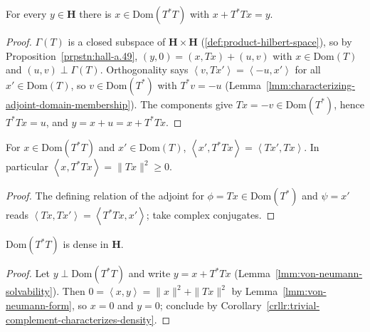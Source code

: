 \begin{lemma}[Solvability of $x + T^*Tx = y$]
    \label{lmm:von-neumann-solvability}
    \leanok
    For every $y \in \mathbf{H}$ there is $x \in \text{Dom}(T^*T)$ with $x + T^*Tx = y$.
\end{lemma}
\begin{proof}
    \leanok
    $\Gamma(T)$ is a closed subspace of $\mathbf{H} \times \mathbf{H}$ (\ref{def:product-hilbert-space}), so by Proposition~\ref{prpstn:hall-a.49}, $(y, 0) = (x, Tx) + (u, v)$ with $x \in \text{Dom}(T)$ and $(u, v) \perp \Gamma(T)$. Orthogonality says $\left< v, Tx' \right> = \left< -u, x' \right>$ for all $x' \in \text{Dom}(T)$, so $v \in \text{Dom}(T^*)$ with $T^*v = -u$ (Lemma~\ref{lmm:characterizing-adjoint-domain-membership}). The components give $Tx = -v \in \text{Dom}(T^*)$, hence $T^*Tx = u$, and $y = x + u = x + T^*Tx$.
\end{proof}

\begin{lemma}
    \label{lmm:von-neumann-form}
    \leanok
    For $x \in \text{Dom}(T^*T)$ and $x' \in \text{Dom}(T)$, $\left< x', T^*Tx \right> = \left< Tx', Tx \right>$. In particular $\left< x, T^*Tx \right> = \|Tx\|^2 \ge 0$.
\end{lemma}
\begin{proof}
    \leanok
    The defining relation of the adjoint for $\phi = Tx \in \text{Dom}(T^*)$ and $\psi = x'$ reads $\left< Tx, Tx' \right> = \left< T^*Tx, x' \right>$; take complex conjugates.
\end{proof}

\begin{lemma}
    \label{lmm:von-neumann-dense-domain}
    \leanok
    $\text{Dom}(T^*T)$ is dense in $\mathbf{H}$.
\end{lemma}
\begin{proof}
    \leanok
    Let $y \perp \text{Dom}(T^*T)$ and write $y = x + T^*Tx$ (Lemma~\ref{lmm:von-neumann-solvability}). Then $0 = \left< x, y \right> = \|x\|^2 + \|Tx\|^2$ by Lemma~\ref{lmm:von-neumann-form}, so $x = 0$ and $y = 0$; conclude by Corollary~\ref{crllr:trivial-complement-characterizes-density}.
\end{proof}

